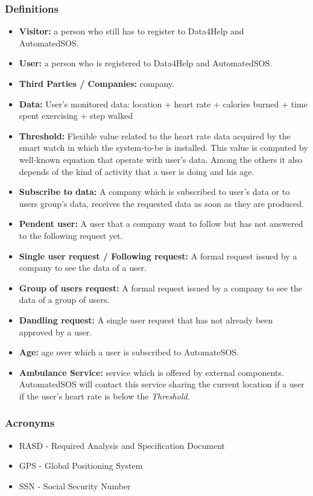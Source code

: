 \documentclass{article}
\begin{document}
\subsubsection{Definitions}
\begin{itemize}
	\item\textbf{Visitor:} a person who still has to register to Data4Help and\\ AutomatedSOS.
	\item\textbf{User:} a person who is registered to Data4Help and AutomatedSOS.
	\item\textbf{Third Parties / Companies:} company.
	\item\textbf{Data:} User's monitored data: location + heart rate + calories burned + time spent exercising + step walked 
	\item \textbf{Threshold:} Flexible value related to the heart rate data acquired by the smart watch in which the system-to-be is installed. This value is computed by well-known equation that operate with user's data. Among the others it also depends of the kind of activity that a user is doing and his age.  
	\item \textbf{Subscribe to data:} A company which is subscribed to user's data or to users group's data, receives the requested data as soon as they are produced.  
	\item \textbf{Pendent user:} A user that a company want to follow but has not answered to the following request yet.
	\item \textbf{Single user request / Following request:} A formal request issued by a company to see the data of a user.
	\item \textbf{Group of users request:} A formal request issued by a company to see the data of a group of users.
	\item \textbf{Dandling request:} A single user request that has not already been approved by a user.
	\item \textbf{Age:} age over which a user is subscribed to AutomateSOS. 
	\item \textbf{Ambulance Service:} service which is offered by external components. AutomatedSOS will contact this service sharing the current location if a user if the user's heart rate is below the \emph{Threshold}.
\end{itemize}
\subsubsection{Acronyms}
\begin{itemize}
	\item RASD - Required Analysis and Specification Document
	\item GPS - Global Positioning System
	\item SSN - Social Security Number
\end{itemize}
\end{document}
